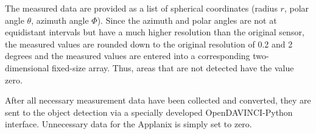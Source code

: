 \documentclass[11pt,oneside,openright]{mpreport}
\begin{document}

The measured data are provided as a list of spherical coordinates (radius $r$, polar angle $\theta $, azimuth angle $\Phi$).
Since the azimuth and polar angles are not at equidistant intervals but have a much higher resolution than the original sensor,
the measured values are rounded down to the original resolution of 0.2 and 2 degrees and the measured values are entered into a corresponding two-dimensional fixed-size array.
Thus, areas that are not detected have the value zero.

After all necessary measurement data have been collected and converted, they are sent to the object detection via a specially developed OpenDAVINCI-Python interface.
Unnecessary data for the Applanix is simply set to zero.
\end{document}
